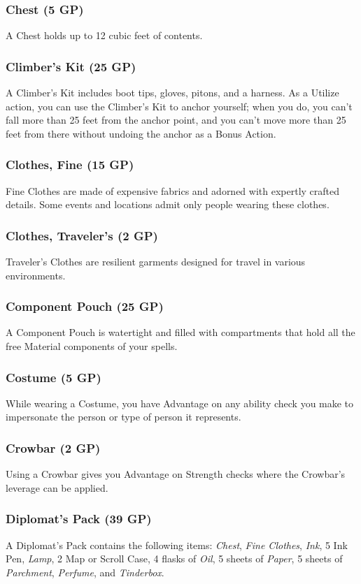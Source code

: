 \documentclass[10pt,a4paper,twoside,bg=print,twocolumn,openany,nodeprecatedcode]{dndbook}
\begin{document}
\subsubsection{Chest (5 GP)}
A Chest holds up to 12 cubic feet of contents.

\subsubsection{Climber's Kit (25 GP)}
A Climber's Kit includes boot tips, gloves, pitons, and a harness. As a Utilize action, you can use the Climber's Kit to anchor yourself; when you do, you can't fall more than 25 feet from the anchor point, and you can't move more than 25 feet from there without undoing the anchor as a Bonus Action.

\subsubsection{Clothes, Fine (15 GP)}
Fine Clothes are made of expensive fabrics and adorned with expertly crafted details. Some events and locations admit only people wearing these clothes.

\subsubsection{Clothes, Traveler's (2 GP)}
Traveler's Clothes are resilient garments designed for travel in various environments.

\subsubsection{Component Pouch (25 GP)}
A Component Pouch is watertight and filled with compartments that hold all the free Material components of your spells.

\subsubsection{Costume (5 GP)}
While wearing a Costume, you have Advantage on any ability check you make to impersonate the person or type of person it represents.

\subsubsection{Crowbar (2 GP)}
Using a Crowbar gives you Advantage on Strength checks where the Crowbar's leverage can be applied.

\subsubsection{Diplomat's Pack (39 GP)}
A Diplomat's Pack contains the following items: \textit{Chest}, \textit{Fine Clothes}, \textit{Ink}, 5 Ink Pen, \textit{Lamp}, 2 Map or Scroll Case, 4 flasks of \textit{Oil}, 5 sheets of \textit{Paper}, 5 sheets of \textit{Parchment}, \textit{Perfume}, and \textit{Tinderbox}.
\end{document}
